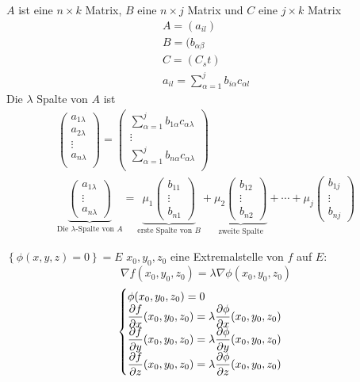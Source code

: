 \begin{Bew}
  $A$ ist eine $n\times k$ Matrix, $B$ eine $n\times j$ Matrix und $C$ eine $j\times k$ Matrix
  \begin{eqnarray*}
    A=(a_{il})\\
    B=(b_{\alpha\beta}\\
    C=(C_st)\\
    a_{il}=\sum^j_{\alpha=1}b_{i\alpha}c_{\alpha l}
  \end{eqnarray*}
  Die $\lambda$ Spalte von $A$ ist
  \begin{eqnarray*}
    \begin{pmatrix}
      a_{1\lambda}\\
      a_{2\lambda}\\
      \vdots\\
      a_{n\lambda}\\
    \end{pmatrix} = \begin{pmatrix}
      \sum^j_{\alpha=1}b_{1\alpha}c_{\alpha\lambda}\\
      \vdots\\
      \sum^j_{\alpha=1}b_{n\alpha}c_{\alpha\lambda}\\
    \end{pmatrix}\\
    \underbrace{\begin{pmatrix}
      a_{1\lambda}\\
      \vdots\\
      a_{n\lambda}
    \end{pmatrix}}_{\text{Die $\lambda$-Spalte von $A$}}
    = \underbrace{\mu_1\begin{pmatrix}
      b_{11}\\\vdots\\ b_{n1}
    \end{pmatrix}}_{\text{erste Spalte von $B$}}
    + \underbrace{\mu_2\begin{pmatrix}
      b_{12}\\\vdots\\ b_{n2}
    \end{pmatrix}}_{\text{zweite Spalte}}
    + \cdots
    + \mu_j\begin{pmatrix}
      b_{1j}\\\vdots\\ b_{nj}
    \end{pmatrix}
  \end{eqnarray*}
\end{Bew}
\begin{Sat}
  $\left\{ \phi(x,y,z)=0 \right\}=E$ $x_0,y_0,z_0$ eine Extremalstelle von $f$ auf $E$:
  \[\nabla f(x_0,y_0,z_0)=\lambda\nabla\phi(x_0,y_0,z_0)\]
  \[\begin{cases}
    \phi(x_0,y_0,z_0)=0\\
    \dfrac{\partial f}{\partial x}(x_0,y_0,z_0)=\lambda\dfrac{\partial \phi}{\partial x}(x_0,y_0,z_0)\\
    \dfrac{\partial f}{\partial y}(x_0,y_0,z_0)=\lambda\dfrac{\partial \phi}{\partial y}(x_0,y_0,z_0)\\
    \dfrac{\partial f}{\partial z}(x_0,y_0,z_0)=\lambda\dfrac{\partial \phi}{\partial z}(x_0,y_0,z_0)
  \end{cases}\]
\end{Sat}
